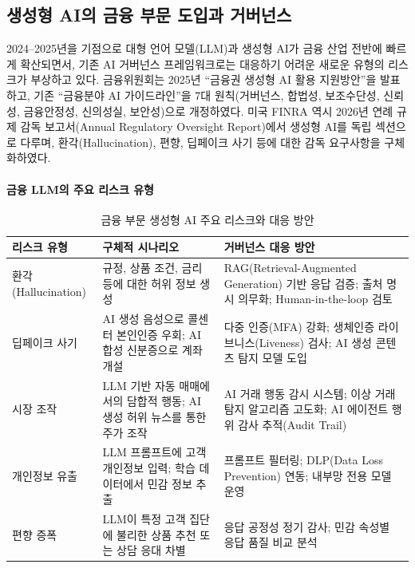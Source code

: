 \subsection{생성형 AI의 금융 부문 도입과 거버넌스}
\label{sec:5.1.5}

2024--2025년을 기점으로 대형 언어 모델(LLM)과 생성형 AI가 금융 산업 전반에
빠르게 확산되면서, 기존 AI 거버넌스 프레임워크로는 대응하기 어려운
새로운 유형의 리스크가 부상하고 있다.
금융위원회는 2025년 ``금융권 생성형 AI 활용 지원방안''을 발표하고,
기존 ``금융분야 AI 가이드라인''을 7대 원칙(거버넌스, 합법성, 보조수단성,
신뢰성, 금융안정성, 신의성실, 보안성)으로 개정하였다\cite{fsc_genai_2025}.
미국 FINRA 역시 2026년 연례 규제 감독 보고서(Annual Regulatory Oversight Report)에서
생성형 AI를 독립 섹션으로 다루며, 환각(Hallucination), 편향,
딥페이크 사기 등에 대한 감독 요구사항을 구체화하였다\cite{finra_2026_report}.

\paragraph{금융 LLM의 주요 리스크 유형}

\begin{table}[htbp]
\centering
\caption{금융 부문 생성형 AI 주요 리스크와 대응 방안}
\label{tab:genai_finance_risks}
\begin{tabularx}{\textwidth}{p{2.5cm}p{3.5cm}X}
\toprule
\textbf{리스크 유형} & \textbf{구체적 시나리오} & \textbf{거버넌스 대응 방안} \\
\midrule
환각(Hallucination) &
규정, 상품 조건, 금리 등에 대한 허위 정보 생성 &
RAG(Retrieval-Augmented Generation) 기반 응답 검증; 출처 명시 의무화; Human-in-the-loop 검토 \\
\midrule
딥페이크 사기 &
AI 생성 음성으로 콜센터 본인인증 우회; AI 합성 신분증으로 계좌 개설 &
다중 인증(MFA) 강화; 생체인증 라이브니스(Liveness) 검사; AI 생성 콘텐츠 탐지 모델 도입 \\
\midrule
시장 조작 &
LLM 기반 자동 매매에서의 담합적 행동; AI 생성 허위 뉴스를 통한 주가 조작 &
AI 거래 행동 감시 시스템; 이상 거래 탐지 알고리즘 고도화; AI 에이전트 행위 감사 추적(Audit Trail) \\
\midrule
개인정보 유출 &
LLM 프롬프트에 고객 개인정보 입력; 학습 데이터에서 민감 정보 추출 &
프롬프트 필터링; DLP(Data Loss Prevention) 연동; 내부망 전용 모델 운영 \\
\midrule
편향 증폭 &
LLM이 특정 고객 집단에 불리한 상품 추천 또는 상담 응대 차별 &
응답 공정성 정기 감사; 민감 속성별 응답 품질 비교 분석 \\
\bottomrule
\end{tabularx}
\end{table}


